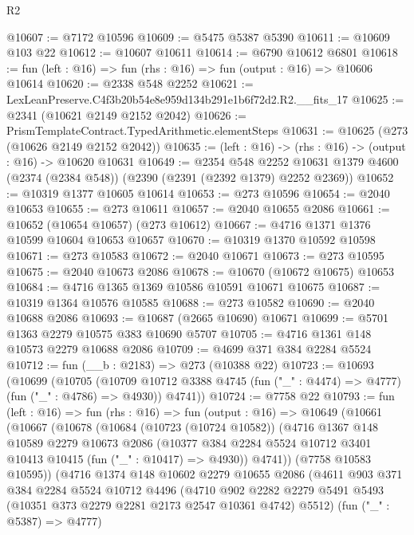 \begin{lexlean}{R2}
\begin{coremodule}
@10607 := @7172 @10596
@10609 := @5475 @5387 @5390
@10611 := @10609 @103 @22
@10612 := @10607 @10611
@10614 := @6790 @10612 @6801
@10618 := fun (left : @16) => fun (rhs : @16) => fun (output : @16) => @10606 @10614
@10620 := @2338 @548 @2252
@10621 := LexLeanPreserve.C4f3b20b54e8e959d134b291e1b6f72d2.R2.__fits_17
@10625 := @2341 (@10621 @2149 @2152 @2042)
@10626 := PrismTemplateContract.TypedArithmetic.elementSteps
@10631 := @10625 (@273 (@10626 @2149 @2152 @2042))
@10635 := (left : @16) -> (rhs : @16) -> (output : @16) -> @10620 @10631
@10649 := @2354
    @548
    @2252
    @10631
    @1379
    @4600
    (@2374 (@2384 @548))
    (@2390 (@2391 (@2392 @1379) @2252 @2369))
@10652 := @10319 @1377 @10605 @10614
@10653 := @273 @10596
@10654 := @2040 @10653
@10655 := @273 @10611
@10657 := @2040 @10655 @2086
@10661 := @10652 (@10654 @10657) (@273 @10612)
@10667 := @4716 @1371 @1376 @10599 @10604 @10653 @10657
@10670 := @10319 @1370 @10592 @10598
@10671 := @273 @10583
@10672 := @2040 @10671
@10673 := @273 @10595
@10675 := @2040 @10673 @2086
@10678 := @10670 (@10672 @10675) @10653
@10684 := @4716 @1365 @1369 @10586 @10591 @10671 @10675
@10687 := @10319 @1364 @10576 @10585
@10688 := @273 @10582
@10690 := @2040 @10688 @2086
@10693 := @10687 (@2665 @10690) @10671
@10699 := @5701 @1363 @2279 @10575 @383 @10690 @5707
@10705 := @4716 @1361 @148 @10573 @2279 @10688 @2086
@10709 := @4699 @371 @384 @2284 @5524
@10712 := fun (__b : @2183) => @273 (@10388 @22)
@10723 := @10693
    (@10699
      (@10705
        (@10709 @10712 @3388 @4745 (fun ("_" : @4474) => @4777) (fun ("_" : @4786) => @4930))
        @4741))
@10724 := @7758 @22
@10793 := fun (left : @16) =>
  fun (rhs : @16) =>
  fun (output : @16) =>
  @10649
    (@10661
      (@10667
        (@10678
          (@10684
            (@10723 (@10724 @10582))
            (@4716
              @1367
              @148
              @10589
              @2279
              @10673
              @2086
              (@10377 @384 @2284 @5524 @10712 @3401 @10413 @10415 (fun ("_" : @10417) => @4930))
              @4741))
          (@7758 @10583 @10595))
        (@4716
          @1374
          @148
          @10602
          @2279
          @10655
          @2086
          (@4611
            @903
            @371
            @384
            @2284
            @5524
            @10712
            @4496
            (@4710
              @902
              @2282
              @2279
              @5491
              @5493
              (@10351 @373 @2279 @2281 @2173 @2547 @10361 @4742)
              @5512)
            (fun ("_" : @5387) => @4777)

\end{coremodule}
\end{lexlean}
